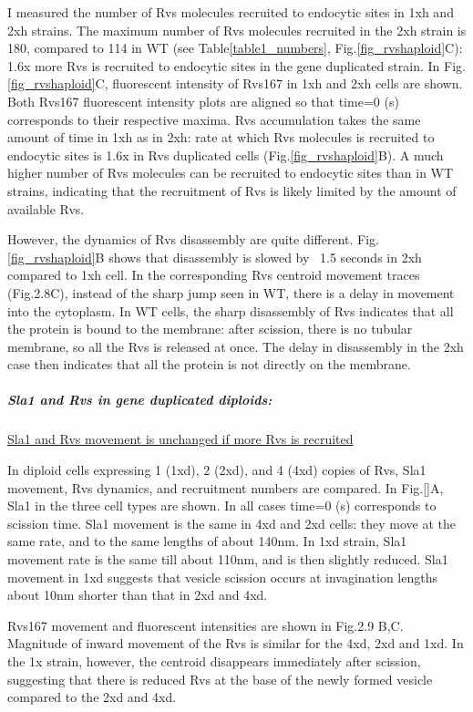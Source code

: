 I measured the number of Rvs molecules recruited to endocytic sites in 1xh and 2xh strains. The maximum number of Rvs molecules recruited in the 2xh strain is 180, compared to 114 in WT (see Table\ref{table1_numbers}, Fig.\ref{fig_rvshaploid}C): 1.6x more Rvs is recruited to endocytic sites in the gene duplicated strain. In Fig.\ref{fig_rvshaploid}C, fluorescent intensity of Rvs167 in 1xh and 2xh cells are shown. Both Rvs167 fluorescent intensity plots are aligned so that time=0 (s) corresponds to their respective maxima. Rvs accumulation takes the same amount of time in 1xh as in 2xh: rate at which Rvs molecules is recruited to endocytic sites is 1.6x in Rvs duplicated cells (Fig.\ref{fig_rvshaploid}B). A much higher number of Rvs molecules can be recruited to endocytic sites than in WT strains, indicating that the recruitment of Rvs is likely limited by the amount of available Rvs.

However, the dynamics of Rvs disassembly are quite different. Fig.\ref{fig_rvshaploid}B shows that disassembly is slowed by ~1.5 seconds in 2xh compared to 1xh cell. In the corresponding Rvs centroid movement traces (Fig.2.8C), instead of the sharp jump seen in WT, there is a delay in movement into the cytoplasm. 
In WT cells, the sharp disassembly of Rvs indicates that all the protein is bound to the membrane: after scission, there is no tubular membrane, so all the Rvs is released at once. The delay in disassembly in the 2xh case then indicates that all the protein is not directly on the membrane. 


		
		\subparagraph{Sla1 and Rvs in gene duplicated diploids:}
		\label{sub_rvsdiploids}
		
\underline{Sla1 and Rvs movement is unchanged if more Rvs is recruited}


In diploid cells expressing 1 (1xd), 2 (2xd), and 4 (4xd) copies of Rvs, Sla1 movement, Rvs dynamics, and recruitment numbers are compared. 
In Fig.\ref{}A, Sla1 in the three cell types are shown. In all cases time=0 (s) corresponds to scission time. Sla1 movement is the same in 4xd and 2xd cells: they move at the same rate, and to the same lengths of about 140nm. In 1xd strain, Sla1 movement rate is the same till about 110nm, and is then slightly reduced. Sla1 movement in 1xd suggests that vesicle scission occurs at invagination lengths about 10nm shorter than that in 2xd and 4xd. 

	\vspace{5mm}
Rvs167 movement and fluorescent intensities are shown in Fig.2.9 B,C. 
Magnitude of inward movement of the Rvs is similar for the 4xd, 2xd and 1xd. In the 1x strain, however, the centroid disappears immediately after scission, suggesting that there is reduced Rvs at the base of the newly formed vesicle compared to the 2xd and 4xd.

